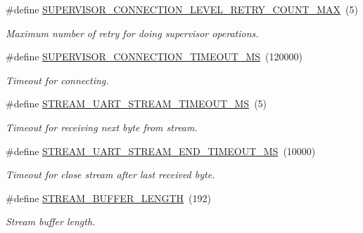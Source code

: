 \begin{DoxyCompactItemize}
\#define \hyperlink{rmap-config_8h_a7ac76db6c397b6167fb6dc9f4c88d6f3}{S\+U\+P\+E\+R\+V\+I\+S\+O\+R\+\_\+\+C\+O\+N\+N\+E\+C\+T\+I\+O\+N\+\_\+\+L\+E\+V\+E\+L\+\_\+\+R\+E\+T\+R\+Y\+\_\+\+C\+O\+U\+N\+T\+\_\+\+M\+AX}~(5)
\begin{DoxyCompactList}\small\item\em Maximum number of retry for doing supervisor operations. \end{DoxyCompactList}\item 
\mbox{\label{rmap-config_8h_a52ca4538c4f04d08d9b1f35329926912}} 
\#define \hyperlink{rmap-config_8h_a52ca4538c4f04d08d9b1f35329926912}{S\+U\+P\+E\+R\+V\+I\+S\+O\+R\+\_\+\+C\+O\+N\+N\+E\+C\+T\+I\+O\+N\+\_\+\+T\+I\+M\+E\+O\+U\+T\+\_\+\+MS}~(120000)
\begin{DoxyCompactList}\small\item\em Timeout for connecting. \end{DoxyCompactList}\item 
\mbox{\label{rmap-config_8h_aa5742869009a8ff3a6e3dfcb700f3ab6}} 
\#define \hyperlink{rmap-config_8h_aa5742869009a8ff3a6e3dfcb700f3ab6}{S\+T\+R\+E\+A\+M\+\_\+\+U\+A\+R\+T\+\_\+\+S\+T\+R\+E\+A\+M\+\_\+\+T\+I\+M\+E\+O\+U\+T\+\_\+\+MS}~(5)
\begin{DoxyCompactList}\small\item\em Timeout for receiving next byte from stream. \end{DoxyCompactList}\item 
\mbox{\label{rmap-config_8h_a950ba415f1afc5bdc2d4ea52b51075df}} 
\#define \hyperlink{rmap-config_8h_a950ba415f1afc5bdc2d4ea52b51075df}{S\+T\+R\+E\+A\+M\+\_\+\+U\+A\+R\+T\+\_\+\+S\+T\+R\+E\+A\+M\+\_\+\+E\+N\+D\+\_\+\+T\+I\+M\+E\+O\+U\+T\+\_\+\+MS}~(10000)
\begin{DoxyCompactList}\small\item\em Timeout for close stream after last received byte. \end{DoxyCompactList}\item 
\mbox{\label{rmap-config_8h_ac5fc989b784c420be7db4f66417fc744}} 
\#define \hyperlink{rmap-config_8h_ac5fc989b784c420be7db4f66417fc744}{S\+T\+R\+E\+A\+M\+\_\+\+B\+U\+F\+F\+E\+R\+\_\+\+L\+E\+N\+G\+TH}~(192)
\begin{DoxyCompactList}\small\item\em Stream buffer length. \end{DoxyCompactList}\item 

\end{DoxyCompactItemize}
